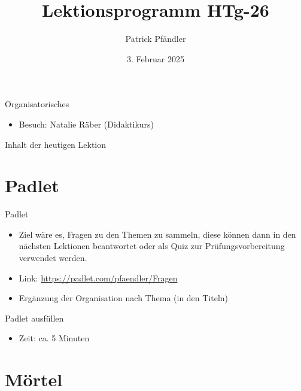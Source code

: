 



\title{\textbf{Lektionsprogramm HTg-26}}
\author{Patrick Pfändler}
\date{3. Februar   2025}




\frame{\titlepage}

\begin{frame}{Organisatorisches}
    \begin{itemize}
        \item[\textbullet] Besuch: Natalie Räber (Didaktikurs)
    \end{itemize}

\end{frame}

\folieFragen


\begin{frame}{Inhalt der heutigen Lektion}
    \tableofcontents
\end{frame}


\section{Padlet}
\BlueSectionSlide
\begin{frame}{Padlet}
    \begin{itemize}
        \item[\textbullet] Ziel wäre es, Fragen zu den Themen zu sammeln, diese können dann in den nächsten Lektionen beantwortet oder als Quiz zur Prüfungsvorbereitung verwendet werden.
        \item[\textbullet] Link: \url{https://padlet.com/pfaendler/Fragen}
        \item[\textbullet] Ergänzung der Organisation nach Thema (in den Titeln)
    \end{itemize}
\end{frame}


\begin{frame}{Padlet ausfüllen}

    \begin{itemize}
        \item Zeit: ca. 5 Minuten
    \end{itemize}

\end{frame}


\section{Mörtel}
\BlueSectionSlide

